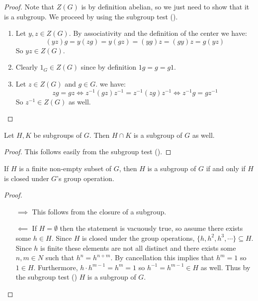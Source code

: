 \documentclass[11pt]{article}
\begin{document}
\begin{proof}
    Note that $Z(G)$ is by definition abelian, so we just need to show that it is a subgroup. We proceed by using the subgroup test ().
    \begin{enumerate}
        \item Let $y,z\in Z(G)$. By associativity and the definition of the center we have:
        \[(yz)g=y(zg)=y(gz)=(yg)z=(gy)z=g(yz)\]
        So $yz\in Z(G)$.
        \item Clearly $1_G\in Z(G)$ since by definition $1g=g=g1$.
        \item Let $z\in Z(G)$ and $g\in G$. we have:
        \[zg=gz\iff z^{-1}(gz)z^{-1}=z^{-1}(zg)z^{-1}\iff z^{-1}g=gz^{-1}\]
        So $z^{-1}\in Z(G)$ as well.
    \end{enumerate}
\end{proof}

\begin{proposition}
    Let $H,K$ be subgroups of $G$. Then $H\cap K$ is a subgroup of $G$ as well.
\end{proposition}

\begin{proof}
    This follows easily from the subgroup test ().
\end{proof}

\begin{proposition}
    If $H$ is a finite non-empty subset of $G$, then $H$ is a subgroup of $G$ if and only if $H$ is closed under $G$'s group operation.
\end{proposition}

\begin{proof}\,
    \begin{itemize}
        \item[$\implies$] This follows from the closure of a subgroup.
        \item[$\impliedby$] If $H=\emptyset$ then the statement is vacuously true, so assume there exists some $h\in H$. Since $H$ is closed under the group operations, $\{h,h^2,h^3,\cdots\}\subseteq H$. Since $h$ is finite these elements are not all distinct and there exists some $n,m\in N$ such that $h^n=h^{n+m}$. By cancellation this implies that $h^m=1$ so $1\in H$. Furthermore, $h\cdot h^{m-1}=h^m=1$ so $h^{-1}=h^{m-1}\in H$ as well. Thus by the subgroup test () $H$ is a subgroup of $G$.
    \end{itemize}
\end{proof}
\end{document}
